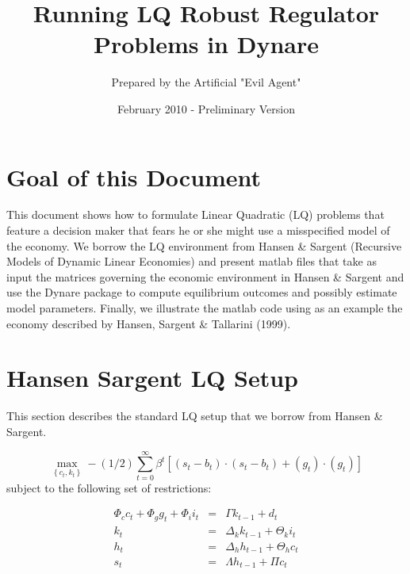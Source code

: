 \documentclass[letter, fleqn, 11pt]{article}
\begin{document}
\title{Running LQ Robust Regulator Problems in Dynare}
\date{February 2010 - Preliminary Version}
\author{Prepared by the Artificial "Evil Agent"}
\maketitle

\section{Goal of this Document}
This document shows how to formulate Linear Quadratic (LQ) problems that feature a decision maker that fears he or she might use a misspecified model of the economy.
We borrow the LQ environment from Hansen \& Sargent (Recursive Models of Dynamic Linear Economies) and present matlab files that take as input the matrices governing the economic environment in Hansen \& Sargent and use the Dynare package to compute equilibrium outcomes and possibly estimate model parameters.
Finally, we illustrate the matlab code using as an example the economy described by Hansen, Sargent \& Tallarini (1999).

\section{Hansen Sargent LQ Setup}

This section describes the standard LQ setup that we borrow from Hansen \& Sargent.

\begin{equation*}
\max_{\left\{ c_{t},k_{t}\right\} }-\left( 1/2\right) \sum_{t=0}^{\infty
}\beta ^{t}\left[ (s_{t}-b_{t})\cdot (s_{t}-b_{t})+(g_{t})\cdot (g_{t})%
\right]
\end{equation*}%
subject to the following set of restrictions:

\begin{eqnarray*}
\Phi _{c}c_{t}+\Phi _{g}g_{t}+\Phi _{i}i_{t} &=&\Gamma k_{t-1}+d_{t} \\
k_{t} &=&\Delta _{k}k_{t-1}+\Theta _{k}i_{t} \\
h_{t} &=&\Delta _{h}h_{t-1}+\Theta _{h}c_{t} \\
s_{t} &=&\Lambda h_{t-1}+\Pi c_{t}
\end{eqnarray*}
\end{document}
